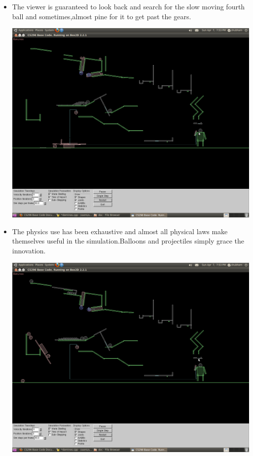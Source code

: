 \documentclass[11pt]{article}
\begin{document}
\begin{itemize}
\begin{center}
 \end{center}
\item The viewer is guaranteed to look back and search for the slow moving fourth ball and sometimes,almost pine for it to get past the gears.
 \begin{center}
 \includegraphics[scale=0.2]{images/I4.png}
 \end{center}
\item The physics use has been exhaustive and almost all physical laws make themselves useful in the simulation.Balloons and projectiles simply grace the innovation. 
 \begin{center}
 \includegraphics[scale=0.2]{images/I3.png}
 \end{center} 
\end{itemize}
\end{document}
